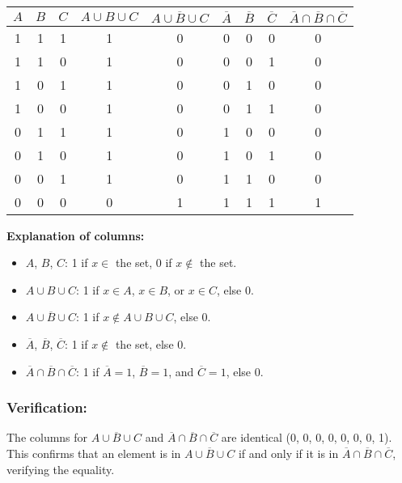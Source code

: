 \documentclass[12pt, a4paper, twoside]{report} %
\begin{document}
\begin{center}
\begin{tabular}{|c|c|c|c|c|c|c|c|c|}
\hline
\( A \) & \( B \) & \( C \) & \( A \cup B \cup C \) & \( \overline{A \cup B \cup C} \) & \( \overline{A} \) & \( \overline{B} \) & \( \overline{C} \) & \( \overline{A} \cap \overline{B} \cap \overline{C} \) \\
\hline
1 & 1 & 1 & 1 & 0 & 0 & 0 & 0 & 0 \\
1 & 1 & 0 & 1 & 0 & 0 & 0 & 1 & 0 \\
1 & 0 & 1 & 1 & 0 & 0 & 1 & 0 & 0 \\
1 & 0 & 0 & 1 & 0 & 0 & 1 & 1 & 0 \\
0 & 1 & 1 & 1 & 0 & 1 & 0 & 0 & 0 \\
0 & 1 & 0 & 1 & 0 & 1 & 0 & 1 & 0 \\
0 & 0 & 1 & 1 & 0 & 1 & 1 & 0 & 0 \\
0 & 0 & 0 & 0 & 1 & 1 & 1 & 1 & 1 \\
\hline
\end{tabular}
\end{center}

\textbf{Explanation of columns:}
\begin{itemize}
  \item \( A \), \( B \), \( C \): 1 if \( x \in \) the set, 0 if \( x \notin \) the set.
  \item \( A \cup B \cup C \): 1 if \( x \in A \), \( x \in B \), or \( x \in C \), else 0.
  \item \( \overline{A \cup B \cup C} \): 1 if \( x \notin A \cup B \cup C \), else 0.
  \item \( \overline{A} \), \( \overline{B} \), \( \overline{C} \): 1 if \( x \notin \) the set, else 0.
  \item \( \overline{A} \cap \overline{B} \cap \overline{C} \): 1 if \( \overline{A} = 1 \), \( \overline{B} = 1 \), and \( \overline{C} = 1 \), else 0.
\end{itemize}

\subsubsection*{Verification:}
The columns for \( \overline{A \cup B \cup C} \) and \( \overline{A} \cap \overline{B} \cap \overline{C} \) are identical (0, 0, 0, 0, 0, 0, 0, 1). This confirms that an element is in \( \overline{A \cup B \cup C} \) if and only if it is in \( \overline{A} \cap \overline{B} \cap \overline{C} \), verifying the equality.
\end{document}
